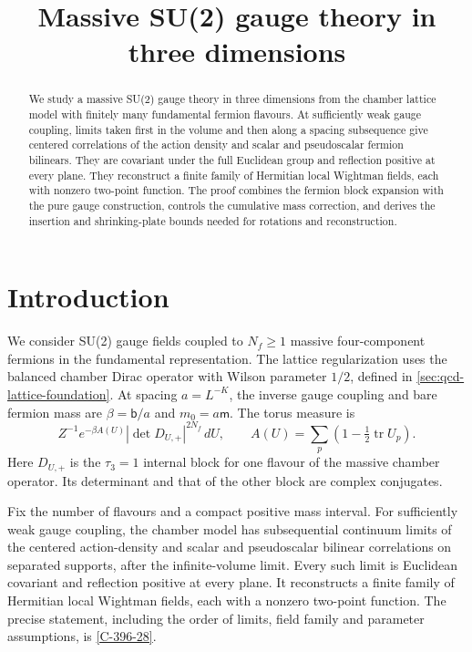 \documentclass[11pt,letterpaper,reqno]{amsart}
\title[Massive SU(2) gauge theory]{Massive SU(2) gauge theory in three dimensions}
\date{}
\makeatletter
\theoremstyle{definition}
\newcommand{\ms@majorstart}{%
  \pushQED{\qed}\renewcommand{\qedsymbol}{$\blacksquare\square$}}
\newenvironment{theoremzero}{\ms@majorstart\ms@theoremzero}
  {\popQED\endms@theoremzero}
\theoremstyle{remark}
\makeatother
\begin{document}
\begin{abstract}
We study a massive SU(2) gauge theory in three dimensions from
the chamber lattice model with finitely many fundamental fermion
flavours. At sufficiently weak gauge coupling, limits taken first
in the volume and then along a spacing subsequence give centered
correlations of the action density and scalar and pseudoscalar
fermion bilinears. They are covariant under the full Euclidean
group and reflection positive at every plane. They reconstruct
a finite family of Hermitian local Wightman fields, each with
nonzero two-point function. The proof combines the fermion block
expansion with the pure gauge construction, controls the cumulative
mass correction, and derives the insertion and shrinking-plate
bounds needed for rotations and reconstruction.
\end{abstract}
\maketitle
\tableofcontents
\section{Introduction}\label{sec:introduction}

We consider SU(2) gauge fields coupled to $N_f\ge1$ massive
four-component fermions in the fundamental representation.
The lattice regularization uses the balanced chamber Dirac
operator with Wilson parameter $1/2$, defined in
\cref{sec:qcd-lattice-foundation}. At spacing $a=L^{-K}$,
the inverse gauge coupling and bare fermion mass are
$\beta=\mathsf b/a$ and $m_0=a\mathsf m$. The torus measure is
\[
 Z^{-1}e^{-\beta A(U)}|\det D_{U,+}|^{2N_f}\,dU,
 \qquad A(U)=\sum_p(1-\tfrac12\operatorname{tr}U_p).
\]
Here $D_{U,+}$ is the $\tau_3=1$ internal block for one flavour
of the massive chamber operator. Its determinant and that
of the other block are complex conjugates.

\begin{theoremzero}
Fix the number of flavours and a compact positive mass interval.
For sufficiently weak gauge coupling, the chamber model has
subsequential continuum limits of the centered action-density
and scalar and pseudoscalar bilinear correlations on separated
supports, after the infinite-volume limit. Every such limit is
Euclidean covariant and reflection positive at every plane.
It reconstructs a finite family of Hermitian local Wightman
fields, each with a nonzero two-point function.
\end{theoremzero}
The precise statement, including the order of limits, field
family and parameter assumptions, is \cref{C-396-28}.
\end{document}
